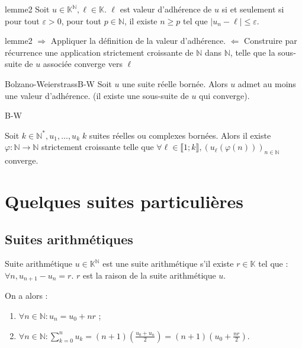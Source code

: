 \documentclass[12pt,a4paper]{report}
\begin{document}
\begin{lemme}{}{lemme2}
Soit $u \in \mathbb{K}^\mathbb{N}, \ell \in \mathbb{K}$. $\ell$ est valeur d'adhérence de $u$ si et seulement si pour tout $\varepsilon > 0$, pour tout $p \in \mathbb{N}$, il existe $n \geq p$ tel que $\lvert u_n - \ell \rvert \leq \varepsilon$.
\end{lemme}

\begin{principedemo}{lemme2}
$\Longrightarrow$ Appliquer la définition de la valeur d'adhérence.
\newline $\Longleftarrow$ Construire par récurrence une application strictement croissante de $\mathbb{N}$ dans $\mathbb{N}$, telle que la sous-suite de $u$ associée converge vers $\ell$
\end{principedemo}



\begin{theoreme}{Bolzano-Weierstrass}{B-W}
Soit $u$ une suite réelle bornée. Alors $u$ admet au moins une valeur d'adhérence. (il existe une sous-suite de $u$ qui converge).
\end{theoreme}

\begin{principedemo}{B-W}

\end{principedemo}

\begin{remarque}{}
Soit $k \in \mathbb{N}^*, u_1,...,u_k \; k$ suites réelles ou complexes bornées. Alors il existe $\varphi : \mathbb{N} \rightarrow \mathbb{N}$ strictement croissante telle que $\forall \ell \in \llbracket 1;k \rrbracket, (u_\ell(\varphi(n)))_{n \in \mathbb{N}}$ converge.
\end{remarque}



\newpage

\section{Quelques suites particulières}

\subsection{Suites arithmétiques}

\begin{definition}{Suite arithmétique}{}
$u \in \mathbb{K}^\mathbb{N}$ est une suite arithmétique s'il existe $r \in \mathbb{K}$ tel que : $\forall n, u_{n+1}-u_n=r$.
\newline $r$ est la raison de la suite arithmétique $u$.
\end{definition}
On a alors : \begin{enumerate}
\item $\forall n \in \mathbb{N} : u_n = u_0+nr$ ;
\item $\forall n \in \mathbb{N} : \sum_{k=0}^n u_k = (n+1)\left(\frac{u_0+u_n}{2}\right) = (n+1)\left(u_0 + \frac{nr}{2}\right)$.
\end{enumerate}
\end{document}
